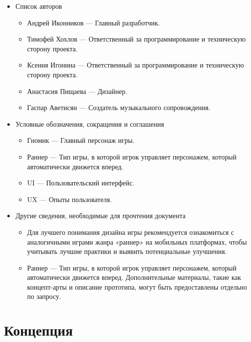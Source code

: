 \documentclass{article}
\begin{document}
\begin{itemize}
\begin{center}
\begin{tabular}{| c | c | c | c |}
\end{tabular}
\end{center}

\item Список авторов
	\begin{itemize}
		\item Андрей Иконников — Главный разработчик.
		\item Тимофей Хохлов — Ответственный за программирование и техническую сторону проекта.
		\item Ксения Игонина — Ответственный за программирование и техническую сторону проекта.
		\item Анастасия Пищаева — Дизайнер.
		\item Гаспар Аветисян — Создатель музыкального сопровождения.
	\end{itemize}

\item Условные обозначения, сокращения и соглашения
	\begin{itemize}
            \item Гномик — Главный персонаж игры.
            \item Раннер — Тип игры, в которой игрок управляет персонажем, который автоматически движется вперед.
            \item UI — Пользовательский интерфейс.
            \item UX — Опыты пользователя.
	\end{itemize}

\item Другие сведения, необходимые для прочтения документа
	\begin{itemize}
            \item Для лучшего понимания дизайна игры рекомендуется ознакомиться с аналогичными играми жанра «раннер» на мобильных платформах, чтобы учитывать лучшие практики и выявить потенциальные улучшения.
            \item Раннер — Тип игры, в которой игрок управляет персонажем, который автоматически движется вперед.
            Дополнительные материалы, такие как концепт-арты и описание прототипа, могут быть предоставлены отдельно по запросу.
	\end{itemize}
\end{itemize}

\section{Концепция}
\end{document}
